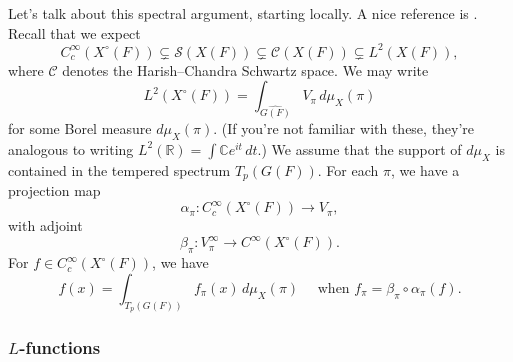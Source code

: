 \documentclass[reqno]{amsart} 
\numberwithin{theorem}{section}
\numberwithin{equation}{section}
\numberwithin{exercise}{section}
\begin{document}
Let's talk about this spectral argument, starting locally.  A nice reference is \cite{MR1075727}.  Recall that we expect
\begin{equation*}
  C_c^\infty(X^{\circ}(F)) \subsetneq \mathcal{S}(X(F)) \subsetneq \mathcal{C}(X(F)) \subsetneq L^2(X(F)),
\end{equation*}
where $\mathcal{C}$ denotes the Harish--Chandra Schwartz space.  We may write
\begin{equation*}
  L^2(X^{\circ}(F)) = \int_{\widehat{G(F)}} V_\pi \, d \mu_X(\pi)
\end{equation*}
for some Borel measure $d \mu_X(\pi)$.  (If you're not familiar with these, they're analogous to writing $L^2(\mathbb{R}) = \int \mathbb{C} e^{i t} \, d t$.)  We assume that the support of $d \mu_X$ is contained in the tempered spectrum $T_p(G(F))$.  For each $\pi$, we have a projection map
\begin{equation*}
  \alpha_\pi : C_c^\infty(X^{\circ}(F)) \rightarrow V_\pi,
\end{equation*}
with adjoint
\begin{equation*}
  \beta_\pi : V_\pi^\infty \rightarrow C^\infty(X^{\circ}(F)).
\end{equation*}
For $f \in C_c^\infty(X^{\circ}(F))$, we have
\begin{equation*}
  f(x) = \int_{T_p(G(F))}
  f_\pi(x)
  \, d \mu_X(\pi)
  \quad
  \text{ when }
  f_\pi = \beta_\pi \circ \alpha_\pi(f).
\end{equation*}


\subsubsection{$L$-functions}
\end{document}
